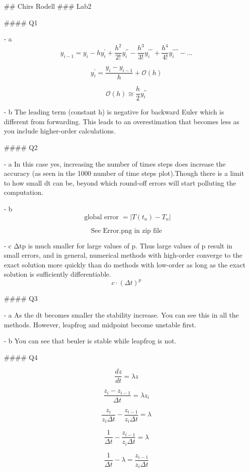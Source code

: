 ## Chirs Rodell
### Lab2

#### Q1

- a\) 
$$
y_{i-1}=y_{i}-h y_{i}^{\prime}+\frac{h^{2}}{2 !} y_{i}^{\prime \prime}-\frac{h^{3}}{3 !} y_{i}^{\prime \prime \prime}+\frac{h^{4}}{4 !} y_{i}^{\prime \prime \prime \prime}-\ldots
$$

$$
y_{i}^{\prime}=\frac{y_{i}-y_{i-1}}{h}+\mathcal{O}(h)
$$


$$
\mathcal{O}(h) \cong \frac{h}{2} y_{i}^{\prime \prime}
$$

- b\)
The leading term (constant h) is negative for backward Euler which is different from forwarding. This leads to an overestimation that becomes less as you include higher-order calculations.

#### Q2

- a\)
In this case yes, increasing the number of times steps does increase the accuracy (as seen in the 1000 number of time steps plot).Though there is a limit to how small dt can be, beyond which round-off errors will start polluting the computation. 



- b\) 
$$\text { global error }=\left|T\left(t_{n}\right)-T_{n}\right|$$

$$
\text {See Error.png in zip file}
$$

- c\)
Δtp is much smaller for large values of p. Thus large values of p result in small errors, and in general, numerical methods with high-order converge to the exact solution more quickly than do methods with low-order as long as the exact solution is sufficiently differentiable. 
$$
c \cdot(\Delta t)^{p}
$$

 

#### Q3

- a\) As the dt becomes smaller the stability increase. You can see this in all the methods. However, leapfrog and midpoint become unstable first.

- b\) You can see that beuler is stable while leapfrog is not.


#### Q4

$$
\frac{d z}{d t}=\lambda z
$$

$$
\frac{z_{i}-z_{i-1}}{\Delta t}=\lambda z_{i}
$$

$$
\frac{z_{i}}{z_{i} \Delta t}-\frac{z_{i-1}}{z_{i} \Delta t}=\lambda
$$

$$
\frac{1}{\Delta t}-\frac{z_{i-1}}{z_{i} \Delta t}=\lambda
$$

$$
\frac{1}{\Delta t}- \lambda=\frac{z_{i-1}}{z_{i} \Delta t}
$$

